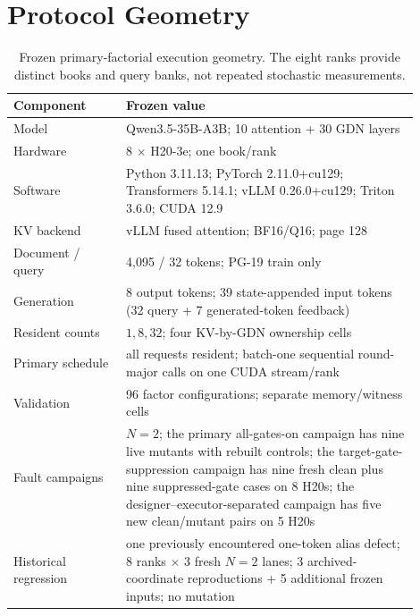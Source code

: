 \documentclass{article}
\begin{document}
\section{Protocol Geometry}
\label{app:protocol-geometry}

\begin{table}[H]
  \caption{Frozen primary-factorial execution geometry.  The eight ranks
  provide distinct books and query banks, not repeated stochastic
  measurements.}
  \label{tab:protocol}
  \centering
  \small
  \begin{tabular}{@{}p{0.25\linewidth}p{0.65\linewidth}@{}}
    \toprule
    Component & Frozen value \\
    \midrule
    Model & Qwen3.5-35B-A3B; 10 attention + 30 GDN layers \\
    Hardware & 8 $\times$ H20-3e; one book/rank \\
    Software & Python 3.11.13; PyTorch 2.11.0+cu129; Transformers 5.14.1; vLLM 0.26.0+cu129; Triton 3.6.0; CUDA 12.9 \\
    KV backend & vLLM fused attention; BF16/Q16; page 128 \\
    Document / query & 4,095 / 32 tokens; PG-19 train only \\
    Generation & 8 output tokens; 39 state-appended input tokens (32 query + 7 generated-token feedback) \\
    Resident counts & $1,8,32$; four KV-by-GDN ownership cells \\
    Primary schedule & all requests resident; batch-one sequential round-major calls on one CUDA stream/rank \\
    Validation & 96 factor configurations; separate memory/witness cells \\
    Fault campaigns & $N=2$; the primary all-gates-on campaign has nine live mutants with rebuilt controls; the target-gate-suppression campaign has nine fresh clean plus nine suppressed-gate cases on 8 H20s; the designer--executor-separated campaign has five new clean/mutant pairs on 5 H20s \\
    Historical regression & one previously encountered one-token alias defect; 8 ranks $\times$ 3 fresh $N=2$ lanes; 3 archived-coordinate reproductions + 5 additional frozen inputs; no mutation \\
    \bottomrule
  \end{tabular}
\end{table}
\end{document}
